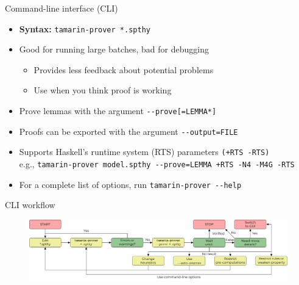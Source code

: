 \documentclass[11pt,aspectratio=169]{beamer}
\begin{document}
\begin{frame}[fragile]{Command-line interface (CLI)}
    \begin{itemize}
        \item \textbf{Syntax:} \hspace*{.2cm}\verb|tamarin-prover *.spthy|
        \item Good for running large batches, bad for debugging
        \begin{itemize}
            \item Provides less feedback about potential problems
            \item Use when you think proof is working
        \end{itemize}
        \item Prove lemmas with the argument \verb|--prove[=LEMMA*]|
        \item Proofs can be exported with the argument \verb|--output=FILE|
        \item Supports Haskell's runtime system (RTS) parameters
              \verb|(+RTS -RTS)|\\e.g.,
              \verb|tamarin-prover model.spthy --prove=LEMMA +RTS -N4 -M4G -RTS|
        \item For a complete list of options, run \verb|tamarin-prover --help|
    \end{itemize}
\end{frame}

\begin{frame}[fragile]{CLI workflow}
    \begin{figure}
        \includegraphics[width=\textwidth]{./figures/lecture_6/workflow_cli}
    \end{figure}
\end{frame}
\end{document}
